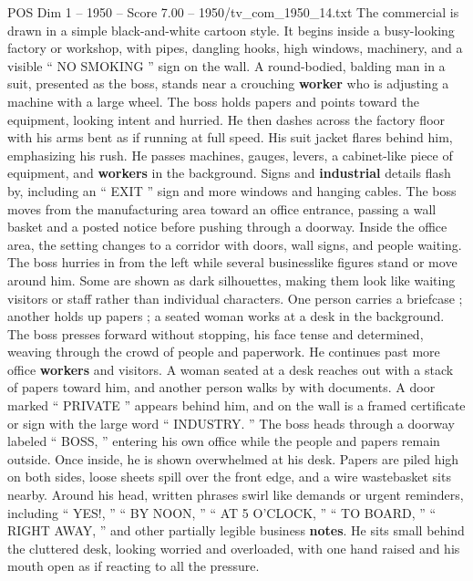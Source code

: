 \begin{textsample}{POS Dim 1 – 1950 – Score 7.00 – 1950/tv\_com\_1950\_14.txt}  \label{ex:f1_pos_083}
The commercial is drawn in a simple black-and-white cartoon style.
It begins inside a busy-looking factory or workshop, with pipes, dangling hooks, high windows, machinery, and a visible “ NO SMOKING ” sign on the wall.
A round-bodied, balding man in a suit, presented as the boss, stands near a crouching \textbf{worker} who is adjusting a machine with a large wheel.
The boss holds papers and points toward the equipment, looking intent and hurried.
He then dashes across the factory floor with his arms bent as if running at full speed.
His suit jacket flares behind him, emphasizing his rush.
He passes machines, gauges, levers, a cabinet-like piece of equipment, and \textbf{workers} in the background.
Signs and \textbf{industrial} details flash by, including an “ EXIT ” sign and more windows and hanging cables.
The boss moves from the manufacturing area toward an office entrance, passing a wall basket and a posted notice before pushing through a doorway.
Inside the office area, the setting changes to a corridor with doors, wall signs, and people waiting.
The boss hurries in from the left while several businesslike figures stand or move around him.
Some are shown as dark silhouettes, making them look like waiting visitors or staff rather than individual characters.
One person carries a briefcase ; another holds up papers ; a seated woman works at a desk in the background.
The boss presses forward without stopping, his face tense and determined, weaving through the crowd of people and paperwork.
He continues past more office \textbf{workers} and visitors.
A woman seated at a desk reaches out with a stack of papers toward him, and another person walks by with documents.
A door marked “ PRIVATE ” appears behind him, and on the wall is a framed certificate or sign with the large word “ INDUSTRY. ” The boss heads through a doorway labeled “ BOSS, ” entering his own office while the people and papers remain outside.
Once inside, he is shown overwhelmed at his desk.
Papers are piled high on both sides, loose sheets spill over the front edge, and a wire wastebasket sits nearby.
Around his head, written phrases swirl like demands or urgent reminders, including “ YES!, ” “ BY NOON, ” “ AT 5 O’CLOCK, ” “ TO BOARD, ” “ RIGHT AWAY, ” and other partially legible business \textbf{notes}.
He sits small behind the cluttered desk, looking worried and overloaded, with one hand raised and his mouth open as if reacting to all the pressure.

\end{textsample}
